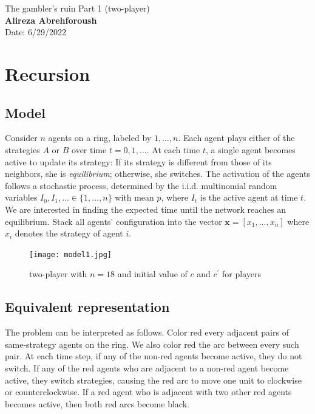 \documentclass[]{book}
\theoremstyle{definition}
\newcommand{\x}{\bm{x}}
\begin{document}
\begin{center}
{\Large The gambler's ruin \hspace{0.5cm} Part 1 (two-player)}\\
\textbf{Alireza Abrehforoush}\\ %
Date: 6/29/2022 %
\end{center}

\vspace{0.2 cm}


\section*{Recursion}
\subsection*{Model}
Consider $n$ agents on a ring, labeled by $1,\ldots, n$. 
Each agent plays either of the strategies $A$ or $B$ over time $t=0,1,\ldots$.
At each time $t$, a single agent becomes active to update its strategy: If its strategy is different from those of its neighbors, she is \emph{equilibrium}; otherwise, she switches.
The activation of the agents follows a stochastic process, determined by the i.i.d. multinomial random variables $I_0,I_1,\ldots\in\{1,\ldots,n\}$ with mean $p$, where $I_t$ is the active agent at time $t$.
We are interested in finding the expected time until the network reaches an equilibrium. 
Stack all agents' configuration into the vector $\x = [x_1,\ldots,x_n]$ where $x_i$ denotes the strategy of agent $i$.
\begin{figure}[ht]
    \centering
    \texttt{[image: model1.jpg]}
    \caption{two-player with $n=18$ and initial value of $c$ and $c^{\prime}$ for players}
    \label{fig:mesh1}
\end{figure}

\subsection*{Equivalent representation}
The problem can be interpreted as follows. 
Color red every adjacent pairs of same-strategy agents on the ring. 
We also color red the arc between every such pair. 
At each time step, if any of the non-red agents become active, they do not switch. 
If any of the red agents who are adjacent to a non-red agent become active, they switch strategies, causing the red arc to move one unit to clockwise or counterclockwise. 
If a red agent who is adjacent with two other red agents becomes active, then both red arcs become black. 
\end{document}
